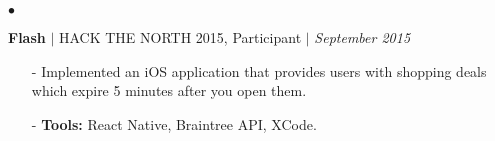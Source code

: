 \documentclass[11pt]{article}
\newenvironment{achievements}{\begin{list}{$\bullet$}{\topsep 0pt \itemsep -1.5pt \leftmargin 5pt}}{\vspace*{4pt}\end{list}}
\begin{document}
\begin{achievements}


\vspace{3pt}

\item \textbf{Flash} {$|$ \scriptsize HACK THE NORTH 2015, Participant} $|$  \href{https://github.com/nakulpathak3/Flash}{\faGithub} \hfill \textit {September 2015}
\begin{itemize}
\item[-]Implemented an iOS application that provides users with shopping deals which expire 5 minutes after you open them.
\vspace{2pt}
\item[-]\textbf{Tools:} React Native, Braintree API, XCode.
\end{itemize}




\end{achievements}
\end{document}
